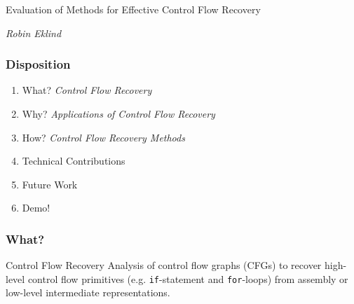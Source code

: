 \documentclass[aspectratio=1610]{beamer}
\begin{document}


\startpage

\begin{frame}
	\vspace{0.02\textheight}

	\begin{Large}
		Evaluation of Methods for Effective Control Flow Recovery
	\end{Large}

	\vspace{0.1\textheight}

	\begin{small}
		\textit{Robin Eklind}
	\end{small}
\end{frame}


\normalpage

\begin{frame}
	\frametitle{Disposition}

	\begin{enumerate}
		\item What? \textit{Control Flow Recovery}
		\item Why? \textit{Applications of Control Flow Recovery}
		\item How? \textit{Control Flow Recovery Methods}
		\item Technical Contributions
		\item Future Work
		\item Demo!
	\end{enumerate}
\end{frame}







\begin{frame}
	\frametitle{What?}

	\begin{block}{Control Flow Recovery}
		Analysis of control flow graphs (CFGs) to recover high-level control flow primitives (e.g. \texttt{if}-statement and \texttt{for}-loops) from assembly or low-level intermediate representations.
	\end{block}
\end{frame}
\end{document}
